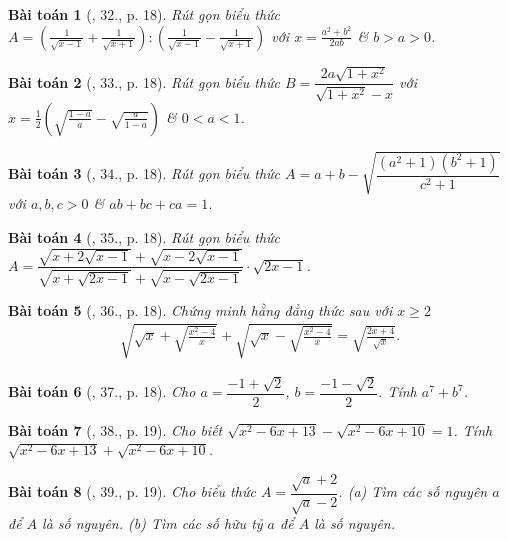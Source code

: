 \documentclass{article}
\newtheorem{baitoan}{Bài toán}
\begin{document}
\begin{baitoan}[\cite{Binh_Toan_9_tap_1}, 32., p. 18]
	Rút gọn biểu thức $A = \left(\frac{1}{\sqrt{x - 1}} + \frac{1}{\sqrt{x + 1}}\right):\left(\frac{1}{\sqrt{x - 1}} - \frac{1}{\sqrt{x + 1}}\right)$ với $x = \frac{a^2 + b^2}{2ab}$ \& $b > a > 0$.
\end{baitoan}

\begin{baitoan}[\cite{Binh_Toan_9_tap_1}, 33., p. 18]
	Rút gọn biểu thức $B = \dfrac{2a\sqrt{1 + x^2}}{\sqrt{1 + x^2} - x}$ với $x = \frac{1}{2}\left(\sqrt{\frac{1 - a}{a}} - \sqrt{\frac{a}{1 - a}}\right)$ \& $0 < a < 1$.
\end{baitoan}

\begin{baitoan}[\cite{Binh_Toan_9_tap_1}, 34., p. 18]
	Rút gọn biểu thức $A = a + b - \sqrt{\dfrac{(a^2 + 1)(b^2 + 1)}{c^2 + 1}}$ với $a,b,c > 0$ \& $ab + bc + ca = 1$.
\end{baitoan}

\begin{baitoan}[\cite{Binh_Toan_9_tap_1}, 35., p. 18]
	Rút gọn biểu thức $A = \dfrac{\sqrt{x + 2\sqrt{x - 1}} + \sqrt{x - 2\sqrt{x - 1}}}{\sqrt{x + \sqrt{2x - 1}} + \sqrt{x - \sqrt{2x - 1}}}\cdot\sqrt{2x - 1}$.
\end{baitoan}

\begin{baitoan}[\cite{Binh_Toan_9_tap_1}, 36., p. 18]
	Chứng minh hằng đẳng thức sau với $x\ge2$
	\begin{align*}
		\sqrt{\sqrt{x} + \sqrt{\frac{x^2 - 4}{x}}} + \sqrt{\sqrt{x} - \sqrt{\frac{x^2 - 4}{x}}} = \sqrt{\frac{2x + 4}{\sqrt{x}}}.
	\end{align*}
\end{baitoan}

\begin{baitoan}[\cite{Binh_Toan_9_tap_1}, 37., p. 18]
	Cho $a = \dfrac{-1 + \sqrt{2}}{2}$, $b = \dfrac{-1 - \sqrt{2}}{2}$. Tính $a^7 + b^7$.
\end{baitoan}

\begin{baitoan}[\cite{Binh_Toan_9_tap_1}, 38., p. 19]
	Cho biết $\sqrt{x^2 - 6x + 13} - \sqrt{x^2 - 6x + 10} = 1$. Tính $\sqrt{x^2 - 6x + 13} + \sqrt{x^2 - 6x + 10}$.
\end{baitoan}

\begin{baitoan}[\cite{Binh_Toan_9_tap_1}, 39., p. 19]
	Cho biểu thức $A = \dfrac{\sqrt{a} + 2}{\sqrt{a} - 2}$. (a) Tìm các số nguyên $a$ để $A$ là số nguyên. (b) Tìm các số hữu tỷ $a$ để $A$ là số nguyên.
\end{baitoan}
\end{document}
